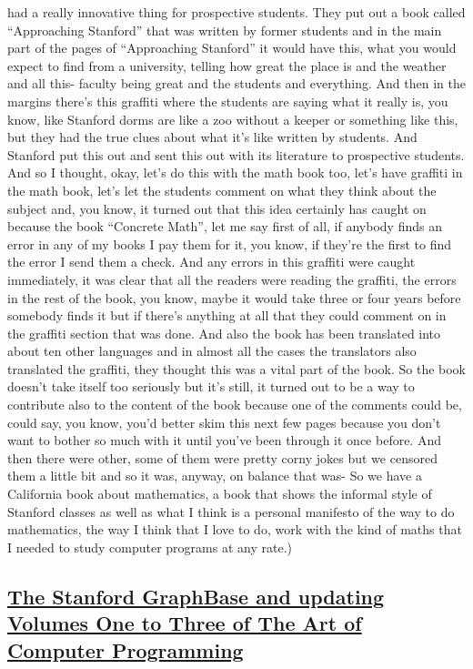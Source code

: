 \documentclass[]{article}
\begin{document}
had a really innovative thing for prospective students. They put out a
book called ``Approaching Stanford'' that was written by former students
and in the main part of the pages of ``Approaching Stanford'' it would
have this, what you would expect to find from a university, telling how
great the place is and the weather and all this- faculty being great and
the students and everything. And then in the margins there's this
graffiti where the students are saying what it really is, you know, like
Stanford dorms are like a zoo without a keeper or something like this,
but they had the true clues about what it's like written by students.
And Stanford put this out and sent this out with its literature to
prospective students. And so I thought, okay, let's do this with the
math book too, let's have graffiti in the math book, let's let the
students comment on what they think about the subject and, you know, it
turned out that this idea certainly has caught on because the book
``Concrete Math'', let me say first of all, if anybody finds an error in
any of my books I pay them for it, you know, if they're the first to
find the error I send them a check. And any errors in this graffiti were
caught immediately, it was clear that all the readers were reading the
graffiti, the errors in the rest of the book, you know, maybe it would
take three or four years before somebody finds it but if there's
anything at all that they could comment on in the graffiti section that
was done. And also the book has been translated into about ten other
languages and in almost all the cases the translators also translated
the graffiti, they thought this was a vital part of the book. So the
book doesn't take itself too seriously but it's still, it turned out to
be a way to contribute also to the content of the book because one of
the comments could be, could say, you know, you'd better skim this next
few pages because you don't want to bother so much with it until you've
been through it once before. And then there were other, some of them
were pretty corny jokes but we censored them a little bit and so it was,
anyway, on balance that was- So we have a California book about
mathematics, a book that shows the informal style of Stanford classes as
well as what I think is a personal manifesto of the way to do
mathematics, the way I think that I love to do, work with the kind of
maths that I needed to study computer programs at any rate.)

\subsection{\texorpdfstring{\href{http://webofstories.com/play/17140}{The
Stanford GraphBase and updating Volumes One to Three of The Art of
Computer
Programming}}{The Stanford GraphBase and updating Volumes One to Three of The Art of Computer Programming}}\label{the-stanford-graphbase-and-updating-volumes-one-to-three-of-the-art-of-computer-programming}
\end{document}
